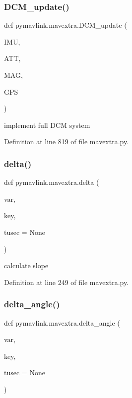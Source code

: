 \subsubsection{\texorpdfstring{DCM\_update()}{DCM\_update()}}
{\footnotesize\ttfamily def pymavlink.\+mavextra.\+D\+C\+M\+\_\+update (\begin{DoxyParamCaption}\item[{}]{I\+MU,  }\item[{}]{A\+TT,  }\item[{}]{M\+AG,  }\item[{}]{G\+PS }\end{DoxyParamCaption})}

\begin{DoxyVerb}implement full DCM system\end{DoxyVerb}
 

Definition at line 819 of file mavextra.\+py.

\mbox{\label{namespacepymavlink_1_1mavextra_a551bb6b34664f22c30ff4eb6342bfd64}} 
\subsubsection{\texorpdfstring{delta()}{delta()}}
{\footnotesize\ttfamily def pymavlink.\+mavextra.\+delta (\begin{DoxyParamCaption}\item[{}]{var,  }\item[{}]{key,  }\item[{}]{tusec = {\ttfamily None} }\end{DoxyParamCaption})}

\begin{DoxyVerb}calculate slope\end{DoxyVerb}
 

Definition at line 249 of file mavextra.\+py.

\mbox{\label{namespacepymavlink_1_1mavextra_a96f32826ccd7a2296e5bb5664d77a9ce}} 
\subsubsection{\texorpdfstring{delta\_angle()}{delta\_angle()}}
{\footnotesize\ttfamily def pymavlink.\+mavextra.\+delta\+\_\+angle (\begin{DoxyParamCaption}\item[{}]{var,  }\item[{}]{key,  }\item[{}]{tusec = {\ttfamily None} }\end{DoxyParamCaption})}

